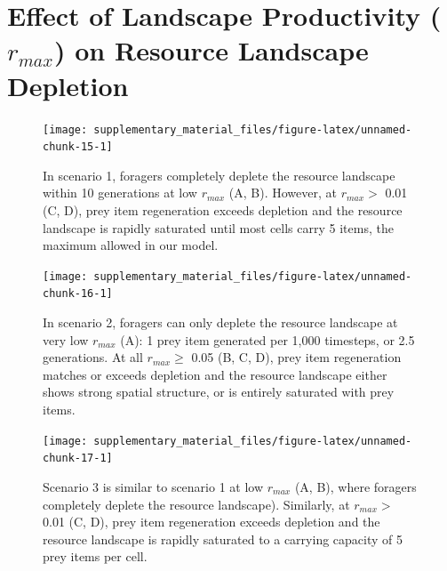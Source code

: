 \documentclass[]{scrartcl}
\begin{document}
\newpage

\hypertarget{effect-of-landscape-productivity-r_max-on-resource-landscape-depletion}{%
\section{\texorpdfstring{Effect of Landscape Productivity (\(r_{max}\)) on Resource Landscape Depletion}{Effect of Landscape Productivity (r\_\{max\}) on Resource Landscape Depletion}}\label{effect-of-landscape-productivity-r_max-on-resource-landscape-depletion}}

\begin{figure}

{\centering \texttt{[image: supplementary\_material\_files/figure-latex/unnamed-chunk-15-1]} 

}

\caption{In scenario 1, foragers completely deplete the resource landscape within 10 generations at low $r_{max}$ (A, B). However, at $r_{max} >$ 0.01 (C, D), prey item regeneration exceeds depletion and the resource landscape is rapidly saturated until most cells carry 5 items, the maximum allowed in our model.}\label{fig:unnamed-chunk-15}
\end{figure}

\begin{figure}

{\centering \texttt{[image: supplementary\_material\_files/figure-latex/unnamed-chunk-16-1]} 

}

\caption{In scenario 2, foragers can only deplete the resource landscape at very low $r_{max}$ (A): 1 prey item generated per 1,000 timesteps, or 2.5 generations. At all $r_{max} \geq$ 0.05 (B, C, D), prey item regeneration matches or exceeds depletion and the resource landscape either shows strong spatial structure, or is entirely saturated with prey items.}\label{fig:unnamed-chunk-16}
\end{figure}

\begin{figure}

{\centering \texttt{[image: supplementary\_material\_files/figure-latex/unnamed-chunk-17-1]} 

}

\caption{Scenario 3 is similar to scenario 1 at low $r_{max}$ (A, B), where foragers completely deplete the resource landscape). Similarly, at $r_{max} >$ 0.01 (C, D), prey item regeneration exceeds depletion and the resource landscape is rapidly saturated to a carrying capacity of 5 prey items per cell.}\label{fig:unnamed-chunk-17}
\end{figure}
\end{document}
